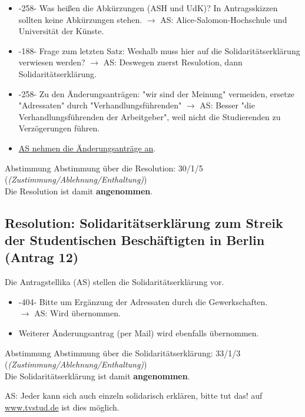     \begin{itemize}
      \item -258- Was heißen die Abkürzungen (ASH und UdK)? In Antragsskizzen sollten keine Abkürzungen stehen.
        $\rightarrow$ AS: Alice-Salomon-Hochschule und Universität der Künste.
      \item -188- Frage zum letzten Satz: Weshalb muss hier auf die Solidaritätserklärung verwiesen werden?
        $\rightarrow$ AS: Deswegen zuerst Resulotion, dann Solidaritätserklärung.
      \item -258- Zu den Änderungsanträgen: "wir sind der Meinung" vermeiden, ersetze "Adressaten" durch "Verhandlungsführenden"
        $\rightarrow$ AS: Besser "die Verhandlungsführenden der Arbeitgeber", weil nicht die Studierenden zu Verzögerungen führen.
      \item \underline{AS nehmen die Änderungsanträge an}.
    \end{itemize}

    \begin{success}{Abstimmung}
      Abstimmung über die Resolution: 30/1/5 (\textit{(Zustimmung/Ablehnung/Enthaltung)}) \\
      Die Resolution ist damit \textbf{angenommen}.
    \end{success}

  \subsection{Resolution: Solidaritätserklärung zum Streik der Studentischen Beschäftigten in Berlin (Antrag 12)}
    Die Antragstellika (AS) stellen die Solidaritätserklärung vor. \\

    \begin{itemize}
      \item -404- Bitte um Ergänzung der Adressaten durch die Gewerkschaften. \\
        $\rightarrow$ AS: Wird übernommen.
      \item Weiterer Änderungsantrag (per Mail) wird ebenfalls übernommen.
    \end{itemize}

    \begin{success}{Abstimmung}
      Abstimmung über die Solidaritätserklärung: 33/1/3 (\textit{(Zustimmung/Ablehnung/Enthaltung)}) \\
      Die Solidaritätserklärung ist damit \textbf{angenommen}.
    \end{success}
    AS: Jeder kann sich auch einzeln solidarisch erklären, bitte tut das!
    auf \url{www.tvstud.de} ist dies möglich.

